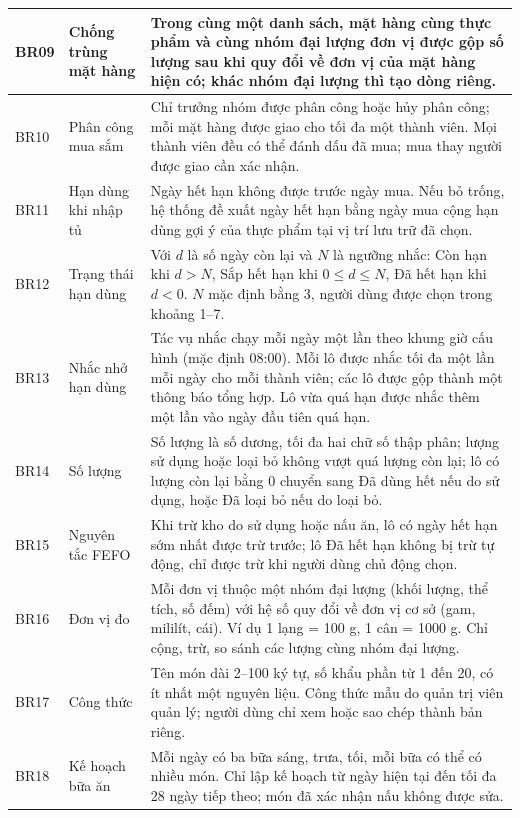 {\begin{longtable}{|C{1.25cm}|L{3.0cm}|L{\dimexpr{}\arrayrulewidth-1.25cm-3.0cm\relax}|}
BR09 & Chống trùng mặt hàng & Trong cùng một danh sách, mặt hàng cùng thực phẩm và cùng nhóm đại lượng đơn vị được gộp số lượng sau khi quy đổi về đơn vị của mặt hàng hiện có; khác nhóm đại lượng thì tạo dòng riêng.\\ \hline
BR10 & Phân công mua sắm & Chỉ trưởng nhóm được phân công hoặc hủy phân công; mỗi mặt hàng được giao cho tối đa một thành viên. Mọi thành viên đều có thể đánh dấu đã mua; mua thay người được giao cần xác nhận.\\ \hline
BR11 & Hạn dùng khi nhập tủ & Ngày hết hạn không được trước ngày mua. Nếu bỏ trống, hệ thống đề xuất ngày hết hạn bằng ngày mua cộng hạn dùng gợi ý của thực phẩm tại vị trí lưu trữ đã chọn.\\ \hline
BR12 & Trạng thái hạn dùng & Với $d$ là số ngày còn lại và $N$ là ngưỡng nhắc: Còn hạn khi $d > N$, Sắp hết hạn khi $0 \le d \le N$, Đã hết hạn khi $d < 0$. $N$ mặc định bằng 3, người dùng được chọn trong khoảng 1–7.\\ \hline
BR13 & Nhắc nhở hạn dùng & Tác vụ nhắc chạy mỗi ngày một lần theo khung giờ cấu hình (mặc định 08:00). Mỗi lô được nhắc tối đa một lần mỗi ngày cho mỗi thành viên; các lô được gộp thành một thông báo tổng hợp. Lô vừa quá hạn được nhắc thêm một lần vào ngày đầu tiên quá hạn.\\ \hline
BR14 & Số lượng & Số lượng là số dương, tối đa hai chữ số thập phân; lượng sử dụng hoặc loại bỏ không vượt quá lượng còn lại; lô có lượng còn lại bằng 0 chuyển sang Đã dùng hết nếu do sử dụng, hoặc Đã loại bỏ nếu do loại bỏ.\\ \hline
BR15 & Nguyên tắc FEFO & Khi trừ kho do sử dụng hoặc nấu ăn, lô có ngày hết hạn sớm nhất được trừ trước; lô Đã hết hạn không bị trừ tự động, chỉ được trừ khi người dùng chủ động chọn.\\ \hline
BR16 & Đơn vị đo & Mỗi đơn vị thuộc một nhóm đại lượng (khối lượng, thể tích, số đếm) với hệ số quy đổi về đơn vị cơ sở (gam, mililít, cái). Ví dụ 1 lạng = 100 g, 1 cân = 1000 g. Chỉ cộng, trừ, so sánh các lượng cùng nhóm đại lượng.\\ \hline
BR17 & Công thức & Tên món dài 2–100 ký tự, số khẩu phần từ 1 đến 20, có ít nhất một nguyên liệu. Công thức mẫu do quản trị viên quản lý; người dùng chỉ xem hoặc sao chép thành bản riêng.\\ \hline
BR18 & Kế hoạch bữa ăn & Mỗi ngày có ba bữa sáng, trưa, tối, mỗi bữa có thể có nhiều món. Chỉ lập kế hoạch từ ngày hiện tại đến tối đa 28 ngày tiếp theo; món đã xác nhận nấu không được sửa.\\ \hline

\end{longtable}}

